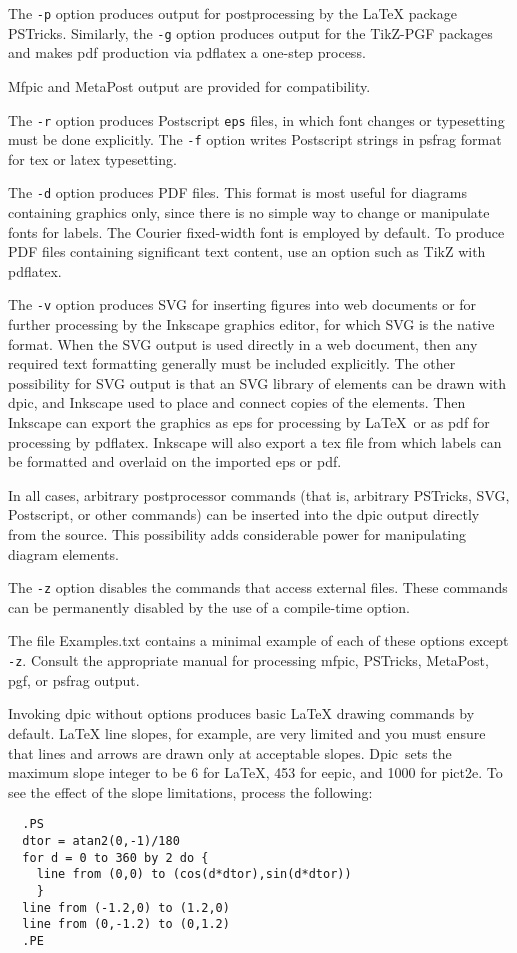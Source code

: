 \documentclass[11pt]{article}
\newcommand{\bq}{}
\newcommand{\Dpic}{{\bq Dpic}}
\begin{document}
The {\tt -p} option produces output for postprocessing by the
LaTeX package PSTricks.
Similarly, the {\tt -g} option produces output
for the TikZ-PGF packages and makes pdf production
via pdflatex a one-step process.

Mfpic and MetaPost output are provided for
compatibility.

The {\tt -r} option produces Postscript {\tt eps}
files, in which font changes or typesetting must be done explicitly.
The {\tt -f} option writes Postscript strings in psfrag
format for tex or latex typesetting.

The {\tt -d} option produces PDF files.
This format is most useful for diagrams containing graphics only, since
there is no simple way to change or manipulate fonts for labels.
The Courier fixed-width font is employed by default.
To produce PDF files containing significant text content,
use an option such as TikZ with pdflatex.

The {\tt -v} option produces SVG for inserting figures into web documents or for
further processing by the Inkscape graphics editor, for which SVG is the
native format.
When the SVG output is used directly in a web document,
then any required text formatting generally must be included explicitly.
The other possibility for SVG output is that an SVG library of elements
can be drawn with dpic, and Inkscape used to place and connect copies
of the elements.  Then Inkscape can export the graphics as eps for
processing by \LaTeX\ or as pdf for processing by pdflatex.  Inkscape
will also export a tex file from which labels can be formatted and
overlaid on the imported eps or pdf.

In all cases, arbitrary postprocessor commands (that is, arbitrary PSTricks,
SVG, Postscript, or other commands) can be inserted into the dpic output
directly from the source.
This possibility adds considerable power for manipulating diagram
elements.

The {\tt -z} option disables the commands that access external files.
These commands can be permanently disabled by the use of a compile-time
option.

The file Examples.txt contains a minimal example of each of these
options except {\tt -z}.  Consult the appropriate manual for processing
mfpic, PSTricks, MetaPost, pgf, or psfrag output.

Invoking dpic without options produces basic LaTeX drawing commands
by default.  LaTeX line slopes, for example, are very limited and you
must ensure that lines and arrows are drawn only at acceptable slopes.
\Dpic\ sets the maximum slope integer to be 6 for LaTeX, 453 for eepic,
and 1000 for pict2e.  To see the effect of the slope limitations,
process the following:
\begin{verbatim}
  .PS
  dtor = atan2(0,-1)/180
  for d = 0 to 360 by 2 do {
    line from (0,0) to (cos(d*dtor),sin(d*dtor))
    }
  line from (-1.2,0) to (1.2,0)
  line from (0,-1.2) to (0,1.2)
  .PE
\end{verbatim}
\end{document}
